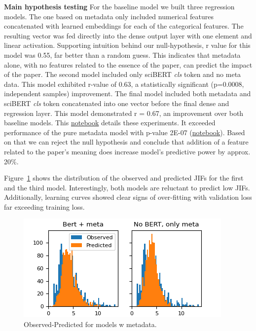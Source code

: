 \documentclass[11pt]{article}
\begin{document}
\textbf{Main hypothesis testing} For the baseline model we built three regression models. The one based on metadata only included numerical features concatenated with learned embeddings for each of the categorical features. The resulting vector was fed directly into the dense output layer with one element and linear activation.  Supporting intuition behind our null-hypothesis, r value for this model was 0.55, far better than a random guess. This indicates that metadata alone, with no features related to the essence of the paper, can predict the impact of the paper. The second model included only sciBERT \textit{cls} token and no meta data. This model exhibited r-value of 0.63, a statistically significant (p=0.0008, independent samples) improvement. The final model included both metadata and sciBERT \textit{cls} token concatenated into one vector before the final dense and regression layer. This model demonstrated r = 0.67, an improvement over both baseline models. This \href{https://github.com/ArtemChemist/w266_project/blob/main/Notebooks/sciBERT%20w%20and%20wo%20meta.ipynb}{notebook} details these experiments. It exceeded performance of the pure metadata model with p-value 2E-07 (\href{https://github.com/ArtemChemist/w266_project/blob/main/Notebooks/Compare%20models.ipynb}{notebook}). Based on that we can reject the null hypothesis and conclude that addition of a feature related to the paper's meaning does increase model's predictive power by approx. 20\%.

Figure~\ref{fig:meta_no_meta} shows the distribution of the observed and predicted JIFs for the first and the third model. Interestingly, both models are reluctant to predict low JIFs. Additionally, learning curves showed clear signs of over-fitting with validation loss far exceeding training loss. 
\begin{figure}
	\includegraphics[width= \columnwidth]{./Images/meta no meta.png}
	\caption{Observed-Predicted for models w metadata.}
	\label{fig:meta_no_meta}
\end{figure}
\end{document}
